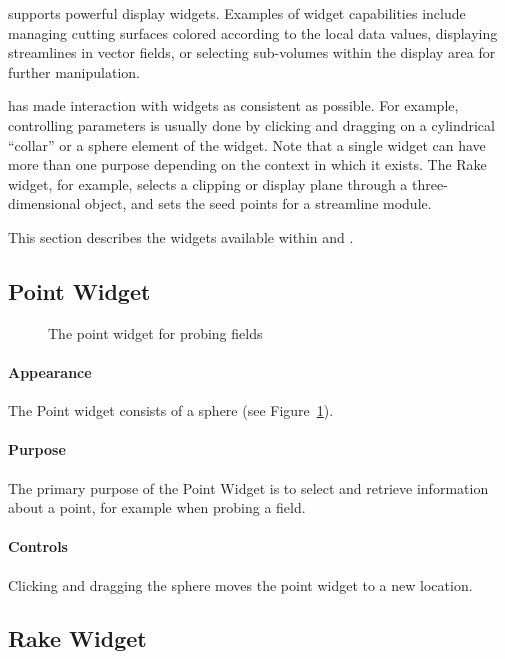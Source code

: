 \SR{} supports powerful display widgets.  Examples of widget
capabilities include managing cutting surfaces colored according to
the local data values, displaying streamlines in vector fields, or
selecting sub-volumes within the display area for further
manipulation.
 
\sci{} has made interaction with widgets as consistent as
possible. For example, controlling parameters is usually done by
clicking and dragging on a cylindrical ``collar'' or a sphere element
of the widget. Note that a single widget can have more than one
purpose depending on the context in which it exists. The Rake widget,
for example, selects a clipping or display plane through a
three-dimensional object, and sets the seed points for a streamline
module.

This section describes the widgets available within \SR{} and \BIOPSE{}.
 
\subsection{Point Widget}
\label{sec:view-pointwidget} 

\begin{figure}[htb]
  \begin{makeimage}
  \end{makeimage}
  \pointwidget
  \caption{\label{fig:pointwidget} The point widget for probing fields}
\end{figure}

\paragraph{Appearance} The Point widget consists of a sphere (see Figure~\ref{fig:pointwidget}).

\paragraph{Purpose} The primary purpose of the Point Widget is to
select and retrieve information about a point, for example when
probing a field.

\paragraph{Controls} Clicking and dragging the sphere moves the point
widget to a new location.

\subsection{Rake Widget}
\label{sec:view-rakewidget} 

